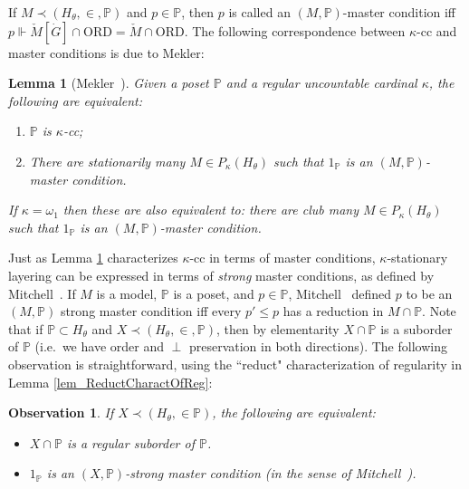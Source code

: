 \documentclass{amsart}
\newtheorem{lemma}[theorem]{Lemma}
\newtheorem{observation}[theorem]{Observation}
\begin{document}
If $M \prec (H_\theta,\in,\mathbb{P})$ and $p \in \mathbb{P}$, then $p$ is called an $(M,\mathbb{P})$-master condition iff $p \Vdash \check{M}[\dot{G}] \cap \text{ORD} = \check{M} \cap \text{ORD}$.  The following correspondence between $\kappa$-cc and master conditions is due to Mekler:
\begin{lemma}[Mekler~\cite{MR758934}]\label{lem_Mekler}
Given a poset $\mathbb{P}$ and a regular uncountable cardinal $\kappa$, the following are equivalent:
\begin{enumerate}
 \item $\mathbb{P}$ is $\kappa$-cc;
 \item There are stationarily many $M  \in P_\kappa(H_\theta)$ such that $1_{\mathbb{P}}$ is an $(M, \mathbb{P})$-master condition.
\end{enumerate}

If $\kappa = \omega_1$ then these are also equivalent to:  there are club many $M  \in P_\kappa(H_\theta)$ such that $1_{\mathbb{P}}$ is an $(M, \mathbb{P})$-master condition.
\end{lemma}

Just as Lemma \ref{lem_Mekler} characterizes $\kappa$-cc  in terms of master conditions, $\kappa$-stationary layering can be expressed in terms of \emph{strong} master conditions, as defined by Mitchell~\cite{MR2279659}.  If $M$ is a model, $\mathbb{P}$ is a poset, and $p \in \mathbb{P}$, Mitchell~\cite{MR2452816} defined $p$ to be an $(M,\mathbb{P})$ strong master condition iff every $p' \le p$ has a reduction in $M \cap \mathbb{P}$.  Note that if $\mathbb{P} \subset H_\theta$ and $X \prec (H_\theta, \in, \mathbb{P})$, then by elementarity $X \cap \mathbb{P}$ is a suborder of $\mathbb{P}$ (i.e.\ we have order and $\perp$ preservation in both directions).  The following observation is straightforward, using the ``reduct" characterization of regularity in Lemma \ref{lem_ReductCharactOfReg}:
\begin{observation}\label{obs_RegSub_StrongMaster}
If $X \prec (H_\theta, \in \mathbb{P})$, the following are equivalent:
\begin{itemize}
 \item $X \cap \mathbb{P}$ is a regular suborder of $\mathbb{P}$.
 \item $1_{\mathbb{P}}$ is an $(X,\mathbb{P})$-strong master condition (in the sense of Mitchell~\cite{MR2452816}).
\end{itemize}
\end{observation}
\end{document}
